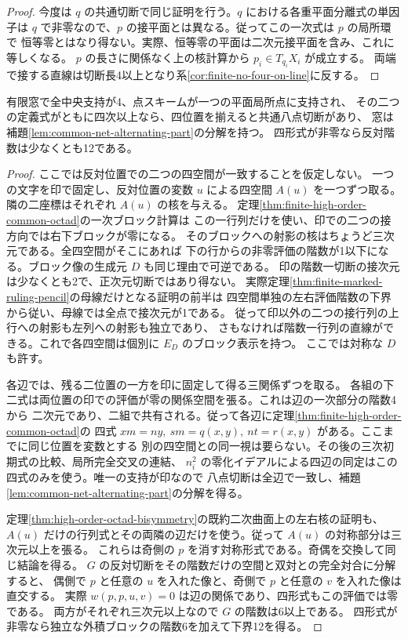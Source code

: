 \begin{proof}
今度は $q$ の共通切断で同じ証明を行う。$q$ における各重平面分離式の単因子は
$q$ で非零なので、$p$ の接平面とは異なる。従ってこの一次式は $p$ の局所環で
恒等零とはなり得ない。実際、恒等零の平面は二次元接平面を含み、これに等しくなる。
$p$ の長さに関係なく上の核計算から $p_i\in T_{q_i}X_i$ が成立する。
両端で接する直線は切断長4以上となり系\ref{cor:finite-no-four-on-line}に反する。
\end{proof}

\begin{lemma}\label{lem:high-order-point-rank-nine}
有限窓で全中央支持が4、点スキームが一つの平面局所点に支持され、
その二つの定義式がともに四次以上なら、四位置を揃えると共通八点切断があり、
窓は補題\ref{lem:common-net-alternating-part}の分解を持つ。
四形式が非零なら反対階数は少なくとも12である。
\end{lemma}
\begin{proof}
ここでは反対位置での二つの四空間が一致することを仮定しない。
一つの文字を印で固定し、反対位置の変数 $u$ による四空間 $A(u)$ を一つずつ取る。
隣の二座標はそれぞれ $A(u)$ の核を与える。
定理\ref{thm:finite-high-order-common-octad}の一次ブロック計算は
この一行列だけを使い、印での二つの接方向では右下ブロックが零になる。
そのブロックへの射影の核はちょうど三次元である。全四空間がそこにあれば
下の行からの非零評価の階数が1以下になる。ブロック像の生成元 $D$ も同じ理由で可逆である。
印の階数一切断の接次元は少なくとも2で、正次元切断ではあり得ない。
実際定理\ref{thm:finite-marked-ruling-pencil}の母線だけとなる証明の前半は
四空間単独の左右評価階数の下界から従い、母線では全点で接次元が1である。
従って印以外の二つの接行列の上行への射影も左列への射影も独立であり、
さもなければ階数一行列の直線ができる。これで各四空間は個別に $E_D$ のブロック表示を持つ。
ここでは対称な $D$ も許す。

各辺では、残る二位置の一方を印に固定して得る三関係ずつを取る。
各組の下二式は両位置の印での評価が零の関係空間を張る。これは辺の一次部分の階数4から
二次元であり、二組で共有される。従って各辺に定理\ref{thm:finite-high-order-common-octad}の
四式 $xm=ny,\ sm=q(x,y),\ nt=r(x,y)$ がある。ここまでに同じ位置を変数とする
別の四空間との同一視は要らない。その後の三次初期式の比較、局所完全交叉の連結、
$n_i^2$ の零化イデアルによる四辺の同定はこの四式のみを使う。唯一の支持が印なので
八点切断は全辺で一致し、補題\ref{lem:common-net-alternating-part}の分解を得る。

定理\ref{thm:high-order-octad-bisymmetry}の既約二次曲面上の左右核の証明も、
$A(u)$ だけの行列式とその両隣の辺だけを使う。従って $A(u)$ の対称部分は三次元以上を張る。
これらは奇側の $p$ を消す対称形式である。奇偶を交換して同じ結論を得る。
$G$ の反対切断をその階数だけの空間と双対との完全対合に分解すると、
偶側で $p$ と任意の $u$ を入れた像と、奇側で $p$ と任意の $v$ を入れた像は直交する。
実際 $w(p,p,u,v)=0$ は辺の関係であり、四形式もこの評価では零である。
両方がそれぞれ三次元以上なので $G$ の階数は6以上である。
四形式が非零なら独立な外積ブロックの階数6を加えて下界12を得る。
\end{proof}


